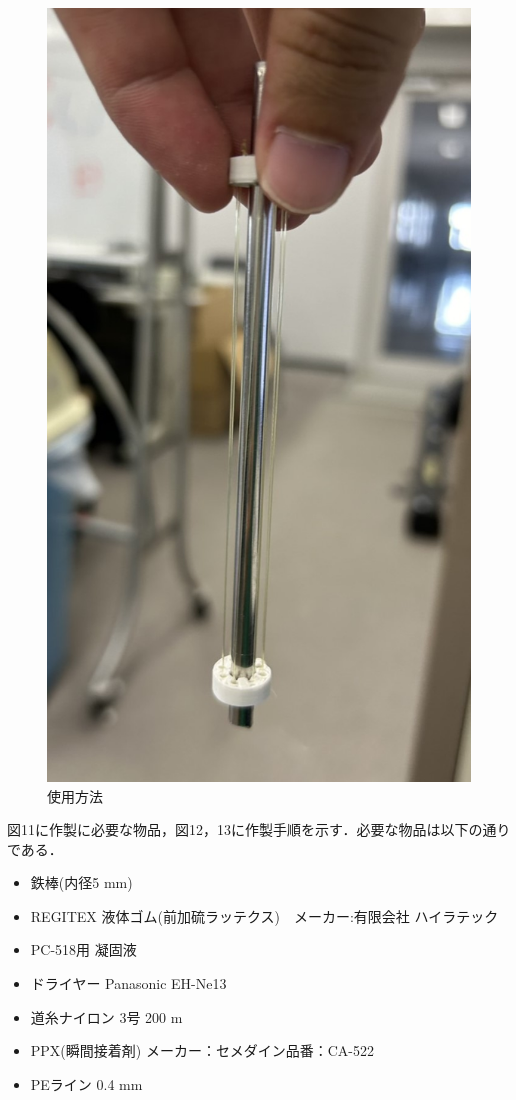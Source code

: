 \begin{figure}[!b]
  \centering  %
  \includegraphics[scale=0.3]{pic/tukau.jpg}
  \caption{使用方法}
\end{figure}
図11に作製に必要な物品，図12，13に作製手順を示す．必要な物品は以下の通りである．
\begin{itemize}
  \item 鉄棒(内径5 mm)
  \item REGITEX 液体ゴム(前加硫ラッテクス)　メーカー:有限会社 ハイラテック
  \item PC-518用 凝固液
  \item ドライヤー Panasonic EH-Ne13
  \item 道糸ナイロン 3号 200 m
  \item PPX(瞬間接着剤) メーカー：セメダイン品番：CA-522
  \item PEライン 0.4 mm
\end{itemize}

